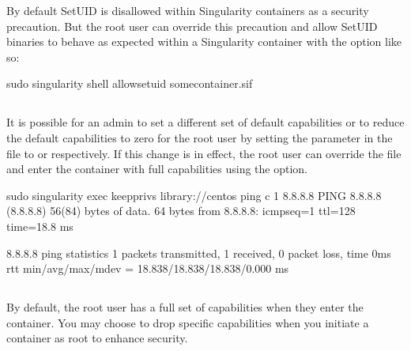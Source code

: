 \documentclass[letterpaper,10pt,english]{sphinxmanual}
\begin{document}
By default SetUID is disallowed within Singularity containers as a security
precaution.  But the root user can override this precaution and allow SetUID
binaries to behave as expected within a Singularity container with the
 option like so:

%
\begin{sphinxVerbatim}[commandchars=\\\{\}]
\PYGZdl{} sudo singularity shell \PYGZhy{}\PYGZhy{}allow\PYGZhy{}setuid some\PYGZus{}container.sif
\end{sphinxVerbatim}


\subsection{}
\label{\detokenize{security_options:keep-privs}}
It is possible for an admin to set a different set of default capabilities or to
reduce the default capabilities to zero for the root user by setting the  parameter in the  file to  or
 respectively.  If this change is in effect, the root user can override
the  file and enter the container with full capabilities
using the  option.

%
\begin{sphinxVerbatim}[commandchars=\\\{\}]
\PYGZdl{} sudo singularity exec \PYGZhy{}\PYGZhy{}keep\PYGZhy{}privs library://centos ping \PYGZhy{}c 1 8.8.8.8
PING 8.8.8.8 (8.8.8.8) 56(84) bytes of data.
64 bytes from 8.8.8.8: icmp\PYGZus{}seq=1 ttl=128 time=18.8 ms

\PYGZhy{}\PYGZhy{}\PYGZhy{} 8.8.8.8 ping statistics \PYGZhy{}\PYGZhy{}\PYGZhy{}
1 packets transmitted, 1 received, 0\PYGZpc{} packet loss, time 0ms
rtt min/avg/max/mdev = 18.838/18.838/18.838/0.000 ms
\end{sphinxVerbatim}


\subsection{}
\label{\detokenize{security_options:drop-caps}}
By default, the root user has a full set of capabilities when they enter the
container. You may choose to drop specific capabilities when you initiate a
container as root to enhance security.
\end{document}

